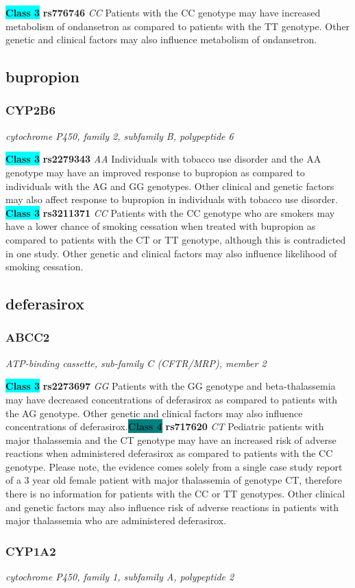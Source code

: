 \documentclass{report}
\begin{document}
\textbf{\colorbox{cyan} {Class 3}} \textbf{ rs776746 } \textit{ CC }
Patients with the CC genotype may have increased metabolism of ondansetron as compared to patients with the TT genotype. Other genetic and clinical factors may also influence metabolism of ondansetron.\newline\subsection{ bupropion }\subsubsection{ CYP2B6 }
\textit{ cytochrome P450, family 2, subfamily B, polypeptide 6 }

\textbf{\colorbox{cyan} {Class 3}} \textbf{ rs2279343 } \textit{ AA }
Individuals with tobacco use disorder and the AA genotype may have an improved response to bupropion as compared to individuals with the AG and GG genotypes. Other clinical and genetic factors may also affect response to bupropion in individuals with tobacco use disorder. \newline\textbf{\colorbox{cyan} {Class 3}} \textbf{ rs3211371 } \textit{ CC }
Patients with the CC genotype who are smokers may have a lower chance of smoking cessation when treated with bupropion as compared to patients with the CT or TT genotype, although this is contradicted in one study. Other genetic and clinical factors may also influence likelihood of smoking cessation.\newline\subsection{ deferasirox }\subsubsection{ ABCC2 }
\textit{ ATP-binding cassette, sub-family C (CFTR/MRP), member 2 }

\textbf{\colorbox{cyan} {Class 3}} \textbf{ rs2273697 } \textit{ GG }
Patients with the GG genotype and beta-thalassemia may have decreased concentrations of deferasirox as compared to patients with the AG genotype. Other genetic and clinical factors may also influence concentrations of deferasirox.\newline\textbf{\colorbox{teal} {Class 4}} \textbf{ rs717620 } \textit{ CT }
Pediatric patients with major thalassemia and the CT genotype may have an increased risk of adverse reactions when administered deferasirox as compared to patients with the CC genotype. Please note, the evidence comes solely from a single case study report of a 3 year old female patient with major thalassemia of genotype CT, therefore there is no information for patients with the CC or TT genotypes. Other clinical and genetic factors may also influence risk of adverse reactions in patients with major thalassemia who are administered deferasirox.\newline\subsubsection{ CYP1A2 }
\textit{ cytochrome P450, family 1, subfamily A, polypeptide 2 }
\end{document}
